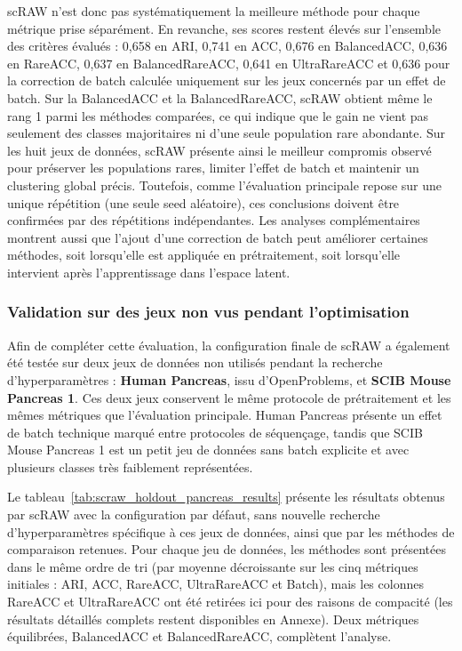 scRAW n'est donc pas systématiquement la meilleure méthode pour chaque métrique prise séparément. En revanche, ses scores restent élevés sur l'ensemble des critères évalués : 0,658 en ARI, 0,741 en ACC, 0,676 en BalancedACC, 0,636 en RareACC, 0,637 en BalancedRareACC, 0,641 en UltraRareACC et 0,636 pour la correction de batch calculée uniquement sur les jeux concernés par un effet de batch. Sur la BalancedACC et la BalancedRareACC, scRAW obtient même le rang 1 parmi les méthodes comparées, ce qui indique que le gain ne vient pas seulement des classes majoritaires ni d'une seule population rare abondante. Sur les huit jeux de données, scRAW présente ainsi le meilleur compromis observé pour préserver les populations rares, limiter l'effet de batch et maintenir un clustering global précis. Toutefois, comme l'évaluation principale repose sur une unique répétition (une seule seed aléatoire), ces conclusions doivent être confirmées par des répétitions indépendantes. Les analyses complémentaires montrent aussi que l'ajout d'une correction de batch peut améliorer certaines méthodes, soit lorsqu'elle est appliquée en prétraitement, soit lorsqu'elle intervient après l'apprentissage dans l'espace latent.

\subsubsection{Validation sur des jeux non vus pendant l'optimisation}

Afin de compléter cette évaluation, la configuration finale de scRAW a également été testée sur deux jeux de données non utilisés pendant la recherche d'hyperparamètres : \textbf{Human Pancreas}, issu d'OpenProblems, et \textbf{SCIB Mouse Pancreas 1}. Ces deux jeux conservent le même protocole de prétraitement et les mêmes métriques que l'évaluation principale. Human Pancreas présente un effet de batch technique marqué entre protocoles de séquençage, tandis que SCIB Mouse Pancreas 1 est un petit jeu de données sans batch explicite et avec plusieurs classes très faiblement représentées.

Le tableau~\ref{tab:scraw_holdout_pancreas_results} présente les résultats obtenus par scRAW avec la configuration par défaut, sans nouvelle recherche d'hyperparamètres spécifique à ces jeux de données, ainsi que par les méthodes de comparaison retenues. Pour chaque jeu de données, les méthodes sont présentées dans le même ordre de tri (par moyenne décroissante sur les cinq métriques initiales : ARI, ACC, RareACC, UltraRareACC et Batch), mais les colonnes RareACC et UltraRareACC ont été retirées ici pour des raisons de compacité (les résultats détaillés complets restent disponibles en Annexe). Deux métriques équilibrées, BalancedACC et BalancedRareACC, complètent l'analyse.

